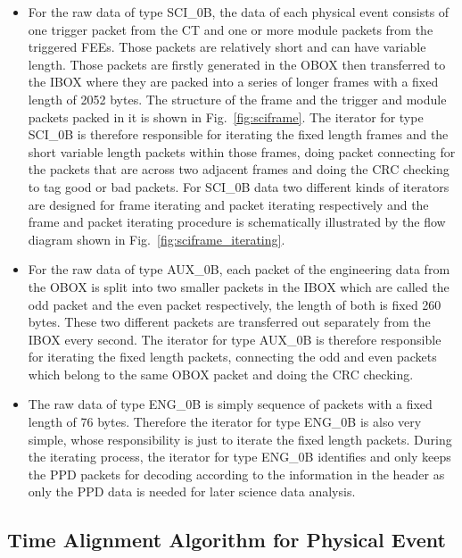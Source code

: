 \documentclass{raa}
\begin{document}
\begin{itemize}

\item For the raw data of type SCI\_0B, the data of each physical event consists of one trigger packet from the CT and one or more module packets from the triggered FEEs. Those packets are relatively short and can have variable length. Those packets are firstly generated in the OBOX then transferred to the IBOX where they are packed into a series of longer frames with a fixed length of 2052 bytes. The structure of the frame and the trigger and module packets packed in it is shown in Fig.~\ref{fig:sciframe}. The iterator for type SCI\_0B is therefore responsible for iterating the fixed length frames and the short variable length packets within those frames, doing packet connecting for the packets that are across two adjacent frames and doing the CRC checking to tag good or bad packets. For SCI\_0B data two different kinds of iterators are designed for frame iterating and packet iterating respectively and the frame and packet iterating procedure is schematically illustrated by the flow diagram shown in Fig.~\ref{fig:sciframe_iterating}.

\item For the raw data of type AUX\_0B, each packet of the engineering data from the OBOX is split into two smaller packets in the IBOX which are called the odd packet and the even packet respectively, the length of both is fixed 260 bytes. These two different packets are transferred out separately from the IBOX every second. The iterator for type AUX\_0B is therefore responsible for iterating the fixed length packets, connecting the odd and even packets which belong to the same OBOX packet and doing the CRC checking.

\item The raw data of type ENG\_0B is simply sequence of packets with a fixed length of 76 bytes. Therefore the iterator for type ENG\_0B is also very simple, whose responsibility is just to iterate the fixed length packets. During the iterating process, the iterator for type ENG\_0B identifies and only keeps the PPD packets for decoding according to the information in the header as only the PPD data is needed for later science data analysis.

\end{itemize}

\subsection{Time Alignment Algorithm for Physical Event} \label{sec:time_alignment}
\end{document}
